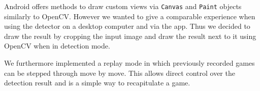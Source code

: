 	Android offers methods to draw custom views via \texttt{Canvas} and \texttt{Paint} objects similarly to OpenCV. However we wanted to give a comparable experience when using the detector on a desktop computer and via the app. Thus we decided to draw the result by cropping the input image and draw the result next to it using OpenCV when in detection mode.

	We furthermore implemented a replay mode in which previously recorded games can be stepped through move by move. This allows direct control over the detection result and is a simple way to recapitulate a game.
